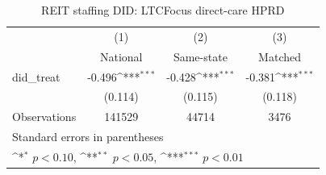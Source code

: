 \begin{table}[htbp]\centering
\def\sym#1{\ifmmode^{#1}\else\(^{#1}\)\fi}
\caption{REIT staffing DID: LTCFocus direct-care HPRD}
\begin{tabular}{l*{3}{c}}
\hline\hline
                    &\multicolumn{1}{c}{(1)}&\multicolumn{1}{c}{(2)}&\multicolumn{1}{c}{(3)}\\
                    &\multicolumn{1}{c}{National}&\multicolumn{1}{c}{Same-state}&\multicolumn{1}{c}{Matched}\\
\hline
did\_treat           &      -0.496\sym{***}&      -0.428\sym{***}&      -0.381\sym{***}\\
                    &     (0.114)         &     (0.115)         &     (0.118)         \\
\hline
Observations        &      141529         &       44714         &        3476         \\
\hline\hline
\multicolumn{4}{l}{\footnotesize Standard errors in parentheses}\\
\multicolumn{4}{l}{\footnotesize \sym{*} \(p<0.10\), \sym{**} \(p<0.05\), \sym{***} \(p<0.01\)}\\
\end{tabular}
\end{table}
